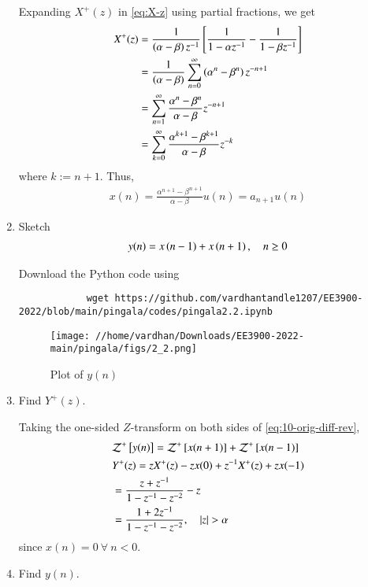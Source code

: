 \documentclass[journal,12pt,twocolumn]{IEEEtran}
\renewcommand\thesection{\arabic{section}}
\begin{document}
\begin{enumerate}[label=\thesection.\arabic*,ref=\thesection.\theenumi]
		\solution Expanding $X^+(z)$ in \eqref{eq:X-z} using partial fractions, we get
		\begin{align}
			X^+(z) &= \frac{1}{\left(\alpha - \beta\right)z^{-1}}{}\left[\frac{1}{1 - \alpha z^{-1}} - \frac{1}{1 - \beta z^{-1}}\right] \\
			&= \frac{1}{\left(\alpha - \beta\right)}\sum_{n = 0}^{\infty}\left(\alpha^n - \beta^n\right)z^{-n + 1} \\
			&= \sum_{n = 1}^{\infty}\frac{\alpha^{n} - \beta^{n}}{\alpha - \beta}z^{-n + 1} \\
			&= \sum_{k = 0}^{\infty}\frac{\alpha^{k + 1} - \beta^{k + 1}}{\alpha - \beta}z^{-k}
		\end{align}
		where $k := n + 1$. Thus,
		\begin{align}
			x(n) = \frac{\alpha^{n + 1} - \beta^{n + 1}}{\alpha - \beta}u(n) = a_{n + 1}u(n)
			\label{eq:x-n-def}
		\end{align}
		\item Sketch 
		\begin{align}
			y(n) = x\left(n-1\right) + x\left(n+1\right),  \quad n \ge 0
			\label{eq:10-orig-diff-rev}
		\end{align}
		
		\solution
		Download the Python code using
		\begin{lstlisting}
			wget https://github.com/vardhantandle1207/EE3900-2022/blob/main/pingala/codes/pingala2.2.ipynb
		\end{lstlisting}
		\begin{figure}[!htbp]
			\texttt{[image: //home/vardhan/Downloads/EE3900-2022-main/pingala/figs/2\_2.png]}
			\caption{Plot of $y(n)$}
			\label{fig:yn}
		\end{figure}
		\item Find $Y^{+}(z)$. 
		
		\solution Taking the one-sided $Z$-transform on both sides of \eqref{eq:10-orig-diff-rev},
		\begin{align}
			&\mathcal{Z}^+{}\left[y(n)\right] = \mathcal{Z}^+{}\left[x(n + 1)\right] + \mathcal{Z}^+{}\left[x(n - 1)\right] \\
			&Y^+(z) = zX^+(z) - zx(0) + z^{-1}X^+(z) + zx(-1) \\
			&= \frac{z + z^{-1}}{1 - z^{-1} - z^{-2}} - z \\
			&= \frac{1 + 2z^{-1}}{1 - z^{-1} - z^{-2}}, \quad |z| > \alpha
		\end{align}
		since $x(n) = 0\ \forall\ n < 0$.
		\item Find $y(n)$.
		\label{pr:1-3}
		

\end{enumerate}
\end{document}
